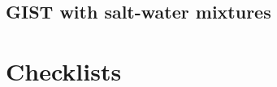 \documentclass[9pt,tutorial]{livecoms}
\begin{document}
\subsection{GIST with salt-water mixtures}

\section{Checklists}

\end{document}
